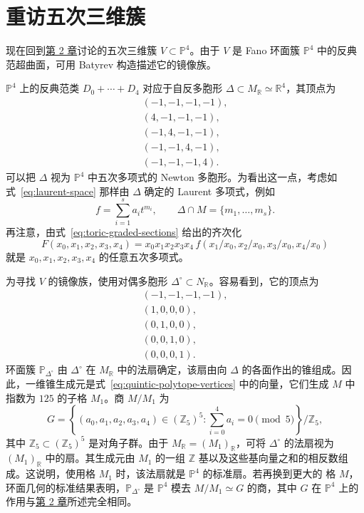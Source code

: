 \section{重访五次三维簇}\label{sec:quintic-revisited}

现在回到\hyperref[chap:quintic]{第 2 章}讨论的五次三维簇 $V\subset\mathbb P^4$。由于 $V$ 是 Fano 环面簇 $\mathbb P^4$ 中的反典范超曲面，可用 Batyrev 构造描述它的镜像族。

$\mathbb P^4$ 上的反典范类 $D_0+\cdots+D_4$ 对应于自反多胞形 $\Delta\subset M_{\mathbb R}\simeq\mathbb R^4$，其顶点为
\begin{equation}\label{eq:quintic-polytope-vertices}
\begin{gathered}
(-1,-1,-1,-1),\\
(4,-1,-1,-1),\\
(-1,4,-1,-1),\\
(-1,-1,4,-1),\\
(-1,-1,-1,4).
\end{gathered}
\end{equation}
可以把 $\Delta$ 视为 $\mathbb P^4$ 中五次多项式的 Newton 多胞形。为看出这一点，考虑如式~\eqref{eq:laurent-space} 那样由 $\Delta$ 确定的 Laurent 多项式，例如
\[
f=\sum_{i=1}^s a_it^{m_i},\qquad
\Delta\cap M=\{m_1,\ldots,m_s\}.
\]
再注意，由式~\eqref{eq:toric-graded-sections} 给出的齐次化
\[
F(x_0,x_1,x_2,x_3,x_4)=
x_0x_1x_2x_3x_4\,f(x_1/x_0,x_2/x_0,x_3/x_0,x_4/x_0)
\]
就是 $x_0,x_1,x_2,x_3,x_4$ 的任意五次多项式。

为寻找 $V$ 的镜像族，使用对偶多胞形 $\Delta^\circ\subset N_{\mathbb R}$。容易看到，它的顶点为
\begin{equation}\label{eq:quintic-polar-vertices}
\begin{gathered}
(-1,-1,-1,-1),\\
(1,0,0,0),\\
(0,1,0,0),\\
(0,0,1,0),\\
(0,0,0,1).
\end{gathered}
\end{equation}
环面簇 $\mathbb P_{\Delta^\circ}$ 由 $\Delta^\circ$ 在 $M_{\mathbb R}$ 中的法扇确定，该扇由向 $\Delta$ 的各面作出的锥组成。因此，一维锥生成元是式~\eqref{eq:quintic-polytope-vertices} 中的向量，它们生成 $M$ 中指数为 $125$ 的子格 $M_1$。商 $M/M_1$ 为
\[
G=\left\{(a_0,a_1,a_2,a_3,a_4)\in(\mathbb Z_5)^5:
\sum_{i=0}^4a_i=0\pmod5\right\}/\mathbb Z_5,
\]
其中 $\mathbb Z_5\subset(\mathbb Z_5)^5$ 是对角子群。由于 $M_{\mathbb R}=(M_1)_{\mathbb R}$，可将 $\Delta^\circ$ 的法扇视为 $(M_1)_{\mathbb R}$ 中的扇。其生成元由 $M_1$ 的一组 $\mathbb Z$ 基以及这些基向量之和的相反数组成。这说明，使用格 $M_1$ 时，该法扇就是 $\mathbb P^4$ 的标准扇。若再换到更大的
格 $M$，环面几何的标准结果表明，$\mathbb P_{\Delta^\circ}$ 是 $\mathbb P^4$ 模去 $M/M_1\simeq G$ 的商，其中 $G$ 在 $\mathbb P^4$ 上的作用与\hyperref[chap:quintic]{第 2 章}所述完全相同。

